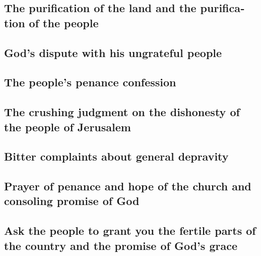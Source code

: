 \begin{paracol}{2}
\begin{otherlanguage}{english}
\hypertarget{the-purification-of-the-land-and-the-purification-of-the-people}{%
\subsection{The purification of the land and the purification of the
people}\label{the-purification-of-the-land-and-the-purification-of-the-people}}

\hypertarget{gods-dispute-with-his-ungrateful-people}{%
\subsection{God's dispute with his ungrateful
people}\label{gods-dispute-with-his-ungrateful-people}}

\hypertarget{the-peoples-penance-confession}{%
\subsection{The people's penance
confession}\label{the-peoples-penance-confession}}

\hypertarget{the-crushing-judgment-on-the-dishonesty-of-the-people-of-jerusalem}{%
\subsection{The crushing judgment on the dishonesty of the people of
Jerusalem}\label{the-crushing-judgment-on-the-dishonesty-of-the-people-of-jerusalem}}

\hypertarget{bitter-complaints-about-general-depravity}{%
\subsection{Bitter complaints about general
depravity}\label{bitter-complaints-about-general-depravity}}

\hypertarget{prayer-of-penance-and-hope-of-the-church-and-consoling-promise-of-god}{%
\subsection{Prayer of penance and hope of the church and consoling
promise of
God}\label{prayer-of-penance-and-hope-of-the-church-and-consoling-promise-of-god}}

\hypertarget{ask-the-people-to-grant-you-the-fertile-parts-of-the-country-and-the-promise-of-gods-grace}{%
\subsection{Ask the people to grant you the fertile parts of the country
and the promise of God's
grace}\label{ask-the-people-to-grant-you-the-fertile-parts-of-the-country-and-the-promise-of-gods-grace}}


\end{otherlanguage}
\end{paracol}
